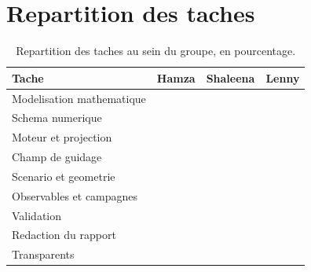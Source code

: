 \section{Repartition des taches}

%

\begin{table}[h]
\centering
\begin{tabular}{lccc}
\toprule
\textbf{Tache} & \textbf{Hamza} & \textbf{Shaleena} & \textbf{Lenny} \\
\midrule
Modelisation mathematique      & & & \\
Schema numerique               & & & \\
Moteur et projection           & & & \\
Champ de guidage               & & & \\
Scenario et geometrie          & & & \\
Observables et campagnes       & & & \\
Validation                     & & & \\
Redaction du rapport           & & & \\
Transparents                   & & & \\
\bottomrule
\end{tabular}
\caption{Repartition des taches au sein du groupe, en pourcentage.}
\end{table}
